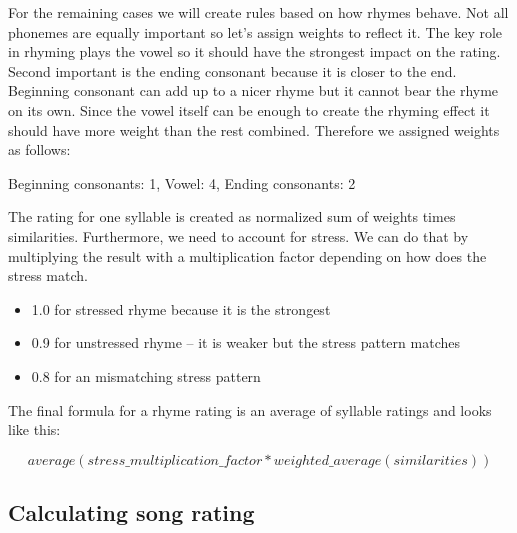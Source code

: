 For the remaining cases we will create rules based on how rhymes behave. Not all phonemes are equally important so let's assign weights to reflect it. The key role in rhyming plays the vowel so it should have the strongest impact on the rating. Second important is the ending consonant because it is closer to the end. Beginning consonant can add up to a nicer rhyme but it cannot bear the rhyme on its own. Since the vowel itself can be enough to create the rhyming effect it should have more weight than the rest combined. Therefore we assigned weights as follows:

Beginning consonants: 1,
Vowel: 4,
Ending consonants: 2

The rating for one syllable is created as normalized sum of weights times similarities. Furthermore, we need to account for stress. We can do that by multiplying the result with a multiplication factor depending on how does the stress match.

\begin{itemize}
	\item 1.0 for stressed rhyme because it is the strongest
	
	\item 0.9 for unstressed rhyme -- it is weaker but the stress pattern matches
	
	\item 0.8 for an mismatching stress pattern
\end{itemize}


The final formula for a rhyme rating is an average of syllable ratings and looks like this:

\[average(stress\_multiplication\_factor*weighted\_average(similarities))\]


\subsection{Calculating song rating}

